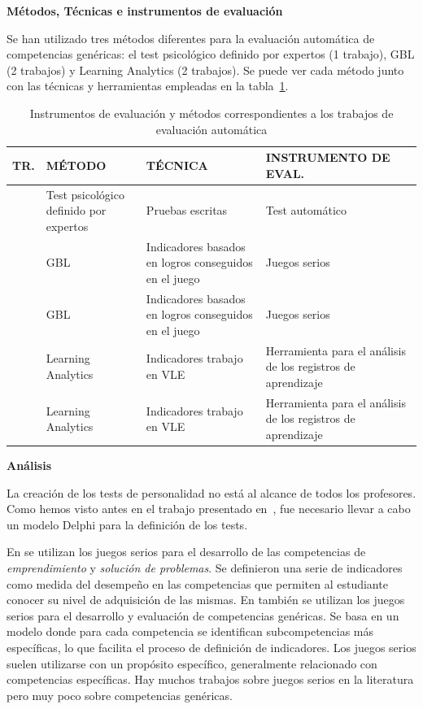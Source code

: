 \bigskip
\textbf{Métodos, Técnicas e instrumentos de evaluación}
\bigskip

Se han utilizado tres métodos diferentes para la evaluación automática de competencias genéricas: el test psicológico definido por expertos (1 trabajo), GBL (2 trabajos) y Learning Analytics (2 trabajos). Se puede ver cada método junto con las técnicas y herramientas empleadas en la tabla~\ref{tab:MetodosAutomaticos}.

\begin{table}
  \begin{center}
  \begin{tabular}{| c | m{3.5cm} | m{5cm} | m{4cm} |}
    \hline
    TR. & MÉTODO & TÉCNICA & INSTRUMENTO DE EVAL. \\
    \hline
    \hline
    \cite{andre2011formal}  & Test psicológico definido por expertos & Pruebas escritas & Test automático \\
    \hline
    \cite{guenaga2013serious}  & GBL & Indicadores basados en logros conseguidos en el juego & Juegos serios \\
    \hline
    \cite{bedek2011behavioral}  & GBL  & Indicadores basados en logros conseguidos en el juego & Juegos serios  \\
    \hline
    \cite{rayon2014web} & Learning Analytics & Indicadores trabajo en VLE & Herramienta para el análisis de los registros de aprendizaje \\
    \hline
    \cite{fidalgo:2015} & Learning Analytics & Indicadores trabajo en VLE & Herramienta para el análisis de los registros de aprendizaje \\
    \hline
  \end{tabular}
\end{center}
\caption{Instrumentos de evaluación y métodos correspondientes a los trabajos de evaluación automática}
\label{tab:MetodosAutomaticos}
\end{table} 


\bigskip
\textbf{Análisis}
\bigskip

La creación de los  tests de personalidad no está al alcance de todos los profesores. Como hemos visto antes en el trabajo presentado en~\cite{andre2011formal}, fue necesario llevar a cabo un modelo Delphi para la definición de los tests.

En \cite{guenaga2013serious} se utilizan los juegos serios para el desarrollo de las competencias de \emph{emprendimiento} y \emph{solución de problemas}. Se definieron una serie de indicadores como medida del desempeño en las competencias que permiten al estudiante conocer su nivel de adquisición de las mismas. En \cite{bedek2011behavioral} también se utilizan los juegos serios para el desarrollo y evaluación de competencias genéricas. Se basa en un modelo donde para cada competencia se identifican subcompetencias más específicas, lo que facilita el proceso de definición de indicadores. Los juegos serios suelen utilizarse con un propósito específico, generalmente relacionado con competencias específicas. Hay muchos trabajos sobre juegos serios en la literatura pero muy poco sobre competencias genéricas. 

